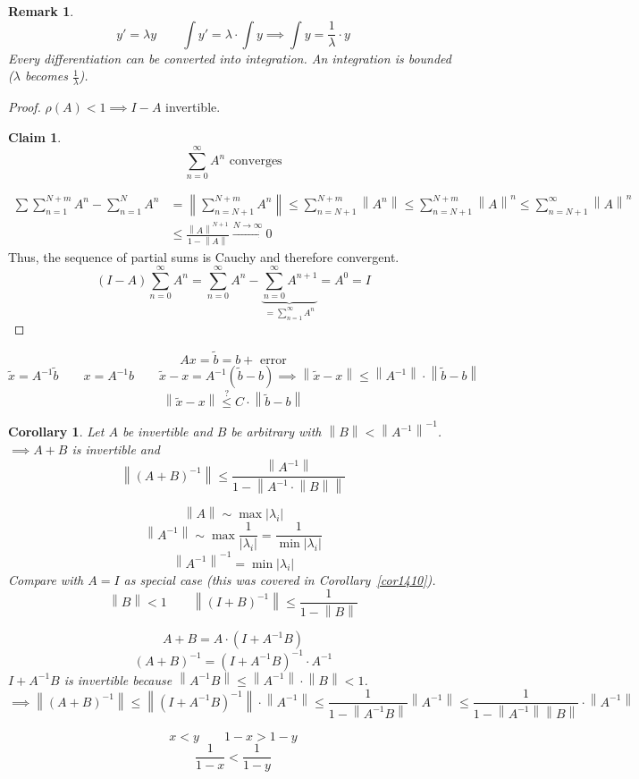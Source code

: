 \documentclass[a4paper]{article}
\newcounter{lecref}[section]
\numberwithin{lecref}{section}
\newtheorem*{claim}{Claim}
\newtheorem*{Remark}{Remark}
\newtheorem{corollary}[lecref]{Corollary}
\newcommand{\norm}[1]{\left\|#1\right\|}
\newcommand{\card}[1]{\left|#1\right|}
\begin{document}
\begin{Remark}
  \[ y' = \lambda y \qquad \int y' = \lambda \cdot \int y \implies \int y = \frac1{\lambda} \cdot y \]
  Every differentiation can be converted into integration. An integration is bounded ($\lambda$ becomes $\frac1{\lambda}$).
\end{Remark}

\begin{proof}
  $\rho(A) < 1 \implies I - A$ invertible.
  \begin{claim}
    \[ \sum_{n=0}^\infty A^n \text{ converges} \]
  \end{claim}
  \begin{align*}
    \sum{\sum_{n=1}^{N+m} A^n - \sum_{n=1}^N A^n}
      &= \norm{\sum_{n=N+1}^{N+m} A^n} \leq \sum_{n=N+1}^{N+m} \norm{A^n} \leq \sum_{n=N+1}^{N+m} \norm{A}^n \leq \sum_{n=N+1}^\infty \norm{A}^n \\
      &\leq \frac{\norm{A}^{N+1}}{1 - \norm{A}} \xrightarrow{N \to \infty} 0
  \end{align*}
  Thus, the sequence of partial sums is Cauchy and therefore convergent.
  \[ (I - A) \sum_{n=0}^\infty A^n = \sum_{n=0}^\infty A^n - \underbrace{\sum_{n=0}^\infty A^{n+1}}_{= \sum_{n=1}^\infty A^n} = A^0 = I \]
\end{proof}

\[ Ax = \tilde b = b + \text{ error} \]
\[ \tilde x = A^{-1} \tilde b \qquad x = A^{-1} b \qquad \tilde x - x = A^{-1} (\tilde b - b) \implies \norm{\tilde x - x} \leq \norm{A^{-1}} \cdot \norm{\tilde b - b} \]
\[ \norm{\tilde x - x} \overset{\text{?}}\leq C \cdot \norm{\tilde b - b} \]

\begin{corollary} %
  Let $A$ be invertible and $B$ be arbitrary with $\norm{B} < \norm{A^{-1}}^{-1}$.
  $\implies A + B$ is invertible and
  \[ \norm{(A + B)^{-1}} \leq \frac{\norm{A^{-1}}}{1 - \norm{A^{-1} \cdot \norm{B}}} \]

  \[ \norm{A} \sim \max\card{\lambda_i} \]
  \[ \norm{A^{-1}} \sim \max\frac{1}{\card{\lambda_i}} = \frac{1}{\min\card{\lambda_i}} \]
  \[ \norm{A^{-1}}^{-1} = \min\card{\lambda_i} \]
  Compare with $A = I$ as special case (this was covered in Corollary~\ref{cor1410}).
  \[ \norm{B} < 1 \qquad \norm{(I + B)^{-1}} \leq \frac{1}{1 - \norm{B}} \]

  \[ A + B = A \cdot (I + A^{-1} B) \]
  \[ (A + B)^{-1} = (I + A^{-1} B)^{-1} \cdot A^{-1} \]
  $I + A^{-1} B$ is invertible because $\norm{A^{-1} B} \leq \norm{A^{-1}} \cdot \norm{B} < 1$.
  \[ \implies \norm{(A + B)^{-1}} \leq \norm{(I + A^{-1} B)^{-1}} \cdot \norm{A^{-1}} \leq \frac{1}{1 - \norm{A^{-1} B}} \norm{A^{-1}} \leq \frac{1}{1 - \norm{A^{-1}} \norm{B}} \cdot \norm{A^{-1}} \]

  \[ x < y \qquad 1 - x > 1 - y \]
  \[ \frac{1}{1 - x} < \frac{1}{1 - y} \]
\end{corollary}
\end{document}
